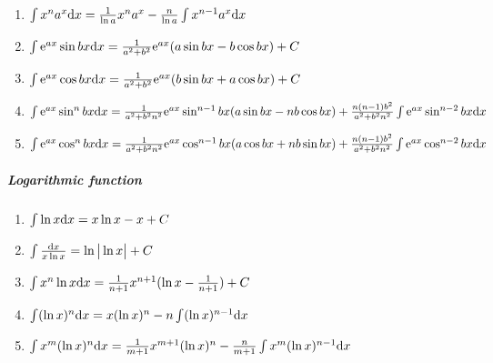 \begin{tiny}
\begin{enumerate}
\item $ \int x^n a^x \mathrm{d} x= \frac{1}{\ln a}x^n a^x-\frac{n}{\ln a}\int x^{n-1}a^x \mathrm{d} x $

\item $ \int \mathrm{e} ^{ax} \sin bx \mathrm{d} x = \frac{1}{a^2+b^2}\mathrm{e} ^{ax}(a \sin bx - b \cos bx)+C $

\item $ \int \mathrm{e} ^{ax} \cos bx \mathrm{d} x = \frac{1}{a^2+b^2}\mathrm{e} ^{ax}(b \sin bx + a \cos bx)+C $

\item $ \int \mathrm{e} ^{ax} \sin ^ n bx \mathrm{d} x=\frac{1}{a^2+b^2 n^2}\mathrm{e} ^{ax} \sin ^ {n-1} bx (a \sin bx -nb \cos bx) +\frac{n(n-1)b^2}{a^2+b^2 n^2}\int \mathrm{e} ^{ax} \sin ^{n-2} bx \mathrm{d} x $

\item $ \int \mathrm{e} ^{ax} \cos ^ n bx \mathrm{d} x=\frac{1}{a^2+b^2 n^2}\mathrm{e} ^{ax} \cos ^ {n-1} bx (a \cos bx +nb \sin bx) +\frac{n(n-1)b^2}{a^2+b^2 n^2}\int \mathrm{e} ^{ax} \cos ^{n-2} bx \mathrm{d} x $

\end{enumerate}

\subparagraph{Logarithmic function}

\begin{enumerate}

\item $ \int \ln x \mathrm{d} x = x \ln x - x + C$

\item $ \int \frac{\mathrm{d} x}{x \ln x} =\ln \big | \ln x \big |+C $

\item $ \int x^n \ln x \mathrm{d} x = \frac{1}{n+1}x^{n+1}(\ln x - \frac{1}{n+1} ) +C $

\item $ \int (\ln x)^{n} \mathrm{d} x = x(\ln x)^ n - n \int (\ln x)^{n-1} \mathrm{d} x $

\item $ \int x ^ m(\ln x)^n \mathrm{d} x=\frac{1}{m+1}x^{m+1} (\ln x)^n - \frac{n}{m+1} \int x^m(\ln x)^{n-1}\mathrm{d} x $

\end{enumerate}

\end{tiny}

